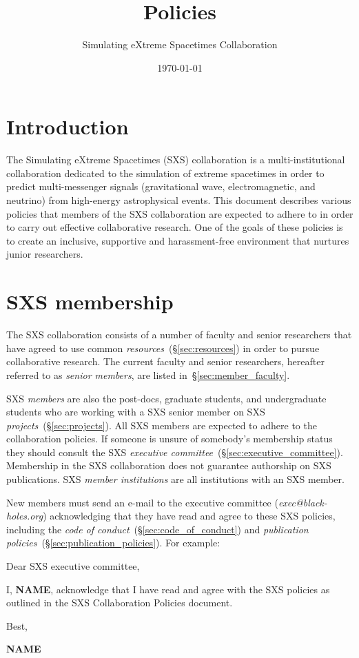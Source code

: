 \documentclass[12pt]{article}
\author{Simulating eXtreme Spacetimes Collaboration}
\date{\today}
\title{Policies}
\begin{document}
\maketitle
\section{Introduction}

The Simulating eXtreme Spacetimes (SXS) collaboration is a
multi-institutional collaboration dedicated to the simulation of
extreme spacetimes in order to predict multi-messenger signals
(gravitational wave, electromagnetic, and neutrino) from high-energy
astrophysical events.  This document describes various policies that
members of the SXS collaboration are expected to adhere to in order to
carry out effective collaborative research.  One of the goals of these
policies is to create an inclusive, supportive and harassment-free
environment that nurtures junior researchers.

\section{SXS membership}\label{sec:sxs_membership}

The SXS collaboration consists of a number of faculty and senior
researchers that have agreed to use common
\emph{resources}~(\S\ref{sec:resources}) in order to pursue
collaborative research.  The current faculty and senior researchers,
hereafter referred to as \emph{senior members}, are listed
in~\S\ref{sec:member_faculty}.

SXS \emph{members} are also the post-docs, graduate students, and
undergraduate students who are working with a SXS senior member on SXS
\emph{projects}~(\S\ref{sec:projects}).  All SXS members are expected
to adhere to the collaboration policies.  If someone is unsure of
somebody's membership status they should consult the SXS
\emph{executive committee}~(\S\ref{sec:executive_committee}).
Membership in the SXS collaboration does not guarantee authorship on
SXS publications.  SXS \emph{member institutions} are all institutions
with an SXS member.

New members must send an e-mail to the executive committee
(\emph{exec@black-holes.org}) acknowledging that they have read and
agree to these SXS policies, including the \emph{code of
  conduct}~(\S\ref{sec:code_of_conduct}) and \emph{publication
  policies}~(\S\ref{sec:publication_policies}).  For example:

\begin{displayquote}
  Dear SXS executive committee,

  I, \textbf{NAME}, acknowledge that I have read and agree with the
  SXS policies as outlined in the SXS Collaboration Policies
  document.

  Best,

  \textbf{NAME}
\end{displayquote}
\end{document}

